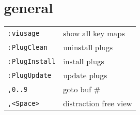 \section{\hrulefill general\hrulefill}
\begin{tabular}{@{}ll@{}}
    \verb!:viusage!     & show all key maps \\
    \verb!:PlugClean!   & uninstall plugs \\
    \verb!:PlugInstall! & install plugs \\
    \verb!:PlugUpdate!  & update plugs \\
    \verb!,0..9!        & goto buf \# \\
    \verb!,<Space>!     & distraction free view \\
\end{tabular}

